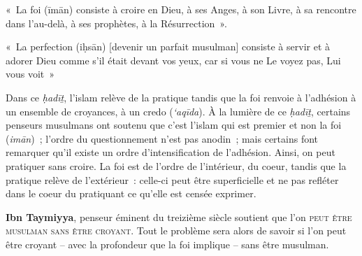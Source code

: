 \begin{Def}[īmān]
«~La foi (īmān) consiste à croire en Dieu, à ses Anges, à son Livre, à
sa rencontre dans l'au-delà, à ses prophètes, à la Résurrection~».
\end{Def}

\begin{Def}[iḥsān]

«~La perfection (iḥsān) {[}devenir un parfait musulman{]} consiste à
servir et à adorer Dieu comme s'il était devant vos yeux, car si vous ne
Le voyez pas, Lui vous voit~»
\end{Def}

Dans ce \emph{ḥadīṯ}, l'islam relève de la pratique tandis que la foi
renvoie à l'adhésion à un ensemble de croyances, à un credo
(\emph{`aqīda}). À la lumière de ce \emph{ḥadīṯ}, certains penseurs
musulmans ont soutenu que c'est l'islam qui est premier et non la foi
(\emph{imān})~; l'ordre du questionnement n'est pas anodin~; mais
certains font remarquer qu'il existe un ordre d'intensification de
l'adhésion. Ainsi, on peut pratiquer sans croire. La foi est de l'ordre
de l'intérieur, du coeur, tandis que la pratique relève de l'extérieur~:
celle-ci peut être superficielle et ne pas refléter dans le coeur du
pratiquant ce qu'elle est censée exprimer.

\FloatBarrier
 \textbf{Ibn Taymiyya},
penseur éminent du treizième siècle soutient que l'on \textsc{peut être musulman
sans être croyant}. Tout le problème sera alors de savoir si l'on peut
être croyant -- avec la profondeur que la foi implique -- sans être
musulman.

